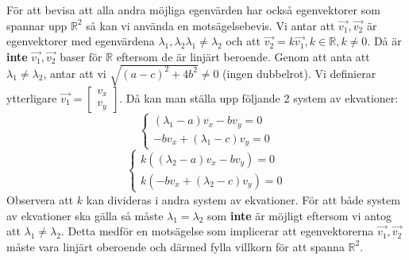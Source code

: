 \documentclass{report}
\begin{document}
{För att bevisa att alla andra möjliga egenvärden har också egenvektorer som spannar upp $\mathbb{R}^2$ så kan vi använda en motsägelsebevis. Vi antar att $\vec{v_1}, \vec{v_2}$ är egenvektorer med egenvärdena $\lambda_1,\lambda_2 \lambda_1 \ne \lambda_2$ och att $\vec{v_2} = k\vec{v_1}, k \in \mathbb{R}, k \ne 0$. Då är \textbf{inte} $\vec{v_1}, \vec{v_2}$ baser för $\mathbb{R}$ eftersom de är linjärt beroende. Genom att anta att $\lambda_1 \ne \lambda_2$, antar att vi $\sqrt{(a-c)^2+4b^2} \ne 0$ (ingen dubbelrot). Vi definierar ytterligare $\vec{v_1} =
\begin{bmatrix}
	v_x\\
	v_y
\end{bmatrix}
$. Då kan man ställa upp följande 2 system av ekvationer:
\begin{equation*}
\begin{cases}
(\lambda_1-a)v_x -bv_y = 0\\
-bv_x+(\lambda_1-c)v_y = 0
\end{cases}
\end{equation*}
\begin{equation*}
\begin{cases}
k((\lambda_2-a)v_x -bv_y) = 0\\
k(-bv_x+(\lambda_2-c)v_y) = 0
\end{cases}
\end{equation*}
Observera att $k$ kan divideras i andra system av ekvationer. För att både system av ekvationer ska gälla så måste $\lambda_1=\lambda_2$ som \textbf{inte} är möjligt eftersom vi antog att $\lambda_1 \ne \lambda_2$. Detta medför en motsägelse som implicerar att egenvektorerna $\vec{v_1}, \vec{v_2}$ måste vara linjärt oberoende och därmed fylla villkorn för att spanna $\mathbb{R}^2$.
}
\end{document}

